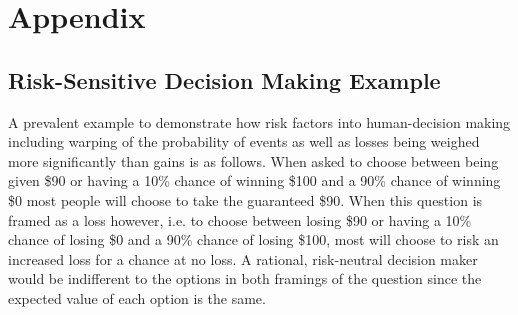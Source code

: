 \documentclass{article}
\begin{document}


\section{Appendix}\label{appendix}



\subsection{Risk-Sensitive Decision Making Example}\label{example}
A prevalent example to demonstrate how risk factors into human-decision making including warping of the probability of events as well as losses being weighed more significantly than gains is as follows. When asked to choose between being given \$90 or having a 10\% chance of winning \$100 and a 90\% chance of winning \$0 most people will choose to take the guaranteed \$90. When this question is framed as a loss however, i.e. to choose between losing \$90 or having a 10\% chance of losing \$0 and a 90\% chance of losing \$100, most will choose to risk an increased loss for a chance at no loss. A rational, risk-neutral decision maker would be indifferent to the options in both framings of the question since the expected value of each option is the same.
\end{document}
